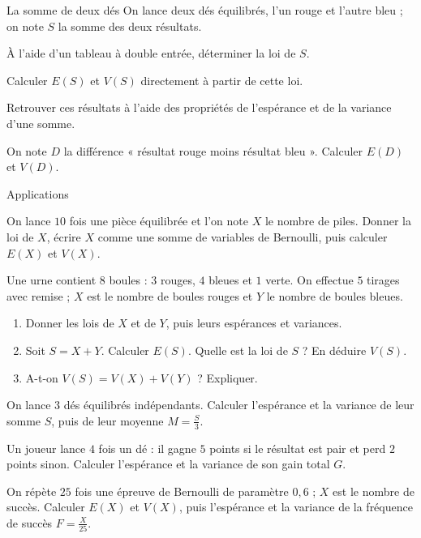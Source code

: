 
\begin{exercice}[2]{La somme de deux dés}
On lance deux dés équilibrés, l'un rouge et l'autre bleu ; on note $S$ la somme des deux résultats.
\begin{questions}
  \item À l'aide d'un tableau à double entrée, déterminer la loi de $S$.
  \item Calculer $E(S)$ et $V(S)$ directement à partir de cette loi.
  \item Retrouver ces résultats à l'aide des propriétés de l'espérance et de la variance d'une somme.
  \item On note $D$ la différence « résultat rouge moins résultat bleu ». Calculer $E(D)$ et $V(D)$.
\end{questions}
\end{exercice}

\begin{exercice}[2]{Applications}
\begin{questions}
  \item On lance $10$ fois une pièce équilibrée et l'on note $X$ le nombre de piles. Donner la loi de $X$, écrire $X$ comme une somme
    de variables de Bernoulli, puis calculer $E(X)$ et $V(X)$.
  \item Une urne contient $8$ boules : $3$ rouges, $4$ bleues et $1$ verte. On effectue $5$ tirages avec remise ; $X$ est le nombre de
    boules rouges et $Y$ le nombre de boules bleues.
    \begin{enumerate}[label=\alph*),leftmargin=1.4em,itemsep=0.3mm,topsep=0.3mm]
      \item Donner les lois de $X$ et de $Y$, puis leurs espérances et variances.
      \item Soit $S=X+Y$. Calculer $E(S)$. Quelle est la loi de $S$ ? En déduire $V(S)$.
      \item A-t-on $V(S)=V(X)+V(Y)$ ? Expliquer.
    \end{enumerate}
  \item On lance $3$ dés équilibrés indépendants. Calculer l'espérance et la variance de leur somme $S$, puis de leur moyenne $M=\frac S3$.
  \item Un joueur lance $4$ fois un dé : il gagne $5$ points si le résultat est pair et perd $2$ points sinon. Calculer l'espérance
    et la variance de son gain total $G$.
  \item On répète $25$ fois une épreuve de Bernoulli de paramètre $0{,}6$ ; $X$ est le nombre de succès. Calculer $E(X)$ et $V(X)$,
    puis l'espérance et la variance de la fréquence de succès $F=\frac{X}{25}$.
\end{questions}
\end{exercice}

